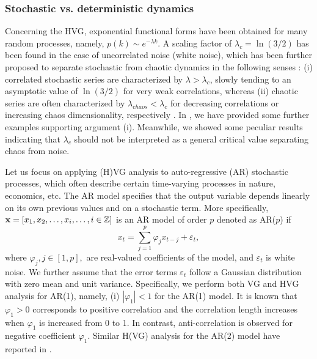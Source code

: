 		\subsubsection{Stochastic vs. deterministic dynamics}
		Concerning the HVG, exponential functional forms have been obtained for many random processes, namely, $p(k) \sim e ^{-\lambda k}$. A scaling factor of $\lambda_c = \ln (3/2)$ has been found in the case of uncorrelated noise (white noise), which has been further proposed to separate stochastic from chaotic dynamics in the following senses \cite{Lacasa2010,Lacasa2014b,Ravetti2014}: (i) correlated stochastic series are characterized by $\lambda > \lambda_c$, slowly tending to an asymptotic value of $\ln (3/2)$ for very weak correlations, whereas (ii) chaotic series are often characterized by $\lambda_{chaos} < \lambda_c$ for decreasing correlations or increasing chaos dimensionality, respectively \cite{Lacasa2010}. In \cite{Zhang2017}, we have provided some further examples supporting argument (i). Meanwhile, we showed some peculiar results indicating that $\lambda_c$ should not be interpreted as a general critical value separating chaos from noise. 
		
		Let us focus on applying (H)VG analysis to auto-regressive (AR) stochastic processes, which often describe certain time-varying processes in nature, economics, etc. The AR model specifies that the output variable depends linearly on its own previous values and on a stochastic term. More specifically, ${\bf x} = [x_1, x_2, \ldots, x_i, \ldots, i \in \mathbb{Z} ]$ is an AR model of order $p$ denoted as AR($p$) if
\begin{equation} \label{def:AR}
x_t = \sum_{j=1}^{p}\varphi_j x_{t-j} + \varepsilon_t, 
\end{equation}
where $\varphi_j, j \in [1, p],$ are real-valued coefficients of the model, and $\varepsilon_t$ is white noise. We further assume that the error terms $\varepsilon_t$ follow a Gaussian distribution with zero mean and unit variance. Specifically, we perform both VG and HVG analysis for AR(1), namely, (i) $|\varphi_1| < 1$ for the AR(1) model. It is known that $\varphi_1 > 0$ corresponds to positive correlation and the correlation length increases when $\varphi_1$ is increased from 0 to 1. In contrast, anti-correlation is observed for negative coefficient $\varphi_1$. Similar H(VG) analysis for the AR(2) model have reported in \cite{Zhang2017}. 

